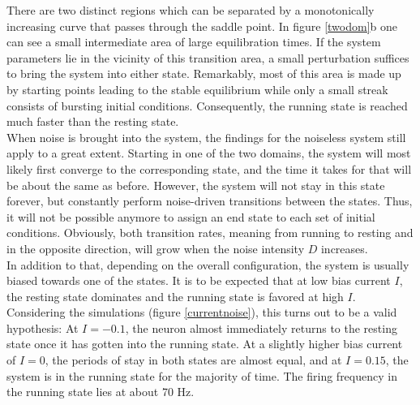 \documentclass[12pt,a4paper]{article}
\begin{document}
There are two distinct regions which can be separated by a monotonically increasing curve that passes through the saddle point. In figure \ref{twodom}b one can see a small intermediate area of large equilibration times. If the system parameters lie in the vicinity of this transition area, a small perturbation suffices to bring the system into either state. Remarkably, most of this area is made up by starting points leading to the stable equilibrium while only a small streak consists of bursting initial conditions. Consequently, the running state is reached much faster than the resting state.
\\
When noise is brought into the system, the findings for the noiseless system still apply to a great extent. Starting in one of the two domains, the system will most likely first converge to the corresponding state, and the time it takes for that will be about the same as before. However, the system will not stay in this state forever, but constantly perform noise-driven transitions between the states. Thus, it will not be possible anymore to assign an end state to each set of initial conditions. Obviously, both transition rates, meaning from running to resting and in the opposite direction, will grow when the noise intensity $D$ increases. \\
In addition to that, depending on the overall configuration, the system is usually biased towards one of the states. It is to be expected that at low bias current $I$, the resting state dominates and the running state is favored at high $I$. Considering the simulations (figure \ref{currentnoise}), this turns out to be a valid hypothesis: At $I=-0.1$, the neuron almost immediately returns to the resting state once it has gotten into the running state. At a slightly higher bias current of $I=0$, the periods of stay in both states are almost equal, and at $I=0.15$, the system is in the running state for the majority of time. The firing frequency in the running state lies at about 70 Hz.
\end{document}
